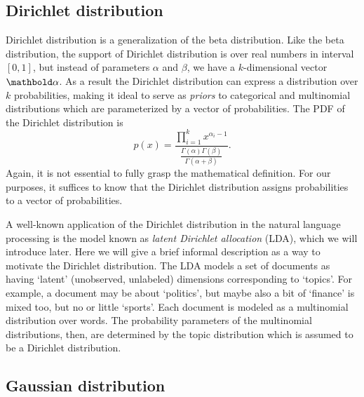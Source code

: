 \subsection{Dirichlet distribution}


Dirichlet distribution is a generalization of the beta distribution.
Like the beta distribution,
the support of Dirichlet distribution is over real numbers in interval $[0,1]$,
but instead of parameters $\alpha$ and $\beta$,
we have a $k$-dimensional vector $\vect{\alpha}$.
As a result the Dirichlet distribution can express a distribution over 
$k$ probabilities,
making it ideal to serve as \emph{priors} to
categorical and multinomial distributions
which are parameterized by a vector of probabilities.
The PDF of the Dirichlet distribution is
\[
  p(x) = \frac{\prod_{i=1}^{k} x^{\alpha_{i}-1}}%
            {\frac{\Gamma(\alpha)\Gamma(\beta)}%
                  {\Gamma(\alpha+\beta)}
            }.
\]
Again, it is not essential to fully grasp the mathematical definition.
For our purposes,
it suffices to know that the Dirichlet distribution assigns
probabilities to a vector of probabilities.

A well-known application of the Dirichlet distribution
in the natural language processing is the model known as
\emph{latent Dirichlet allocation} (LDA),
which we will introduce later.
Here we will give a brief informal description as a way to motivate
the Dirichlet distribution.
The LDA models a set of documents as having
`latent' (unobserved, unlabeled) dimensions corresponding to `topics'.
For example, a document may be about `politics', 
but maybe also a bit of `finance' is mixed too, but no or little `sports'.
Each document is modeled as a multinomial distribution over words.
The probability parameters of the multinomial distributions, then,
are determined by the topic distribution which is assumed to be a Dirichlet distribution.

\subsection{Gaussian distribution}

